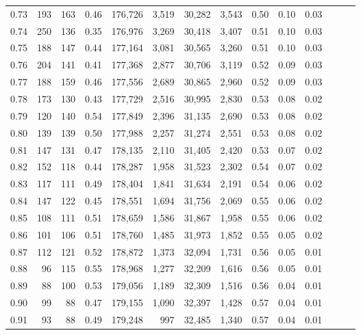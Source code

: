 \begin{tabular}{rrrrrrrrrrrrrr}
0.73 &    193 &  163 &  0.46 &  176,726 &    3,519 &  30,282 &   3,543 &  0.50 &  0.10 &      0.03 \\
0.74 &    250 &  136 &  0.35 &  176,976 &    3,269 &  30,418 &   3,407 &  0.51 &  0.10 &      0.03 \\
0.75 &    188 &  147 &  0.44 &  177,164 &    3,081 &  30,565 &   3,260 &  0.51 &  0.10 &      0.03 \\
0.76 &    204 &  141 &  0.41 &  177,368 &    2,877 &  30,706 &   3,119 &  0.52 &  0.09 &      0.03 \\
0.77 &    188 &  159 &  0.46 &  177,556 &    2,689 &  30,865 &   2,960 &  0.52 &  0.09 &      0.03 \\
0.78 &    173 &  130 &  0.43 &  177,729 &    2,516 &  30,995 &   2,830 &  0.53 &  0.08 &      0.02 \\
0.79 &    120 &  140 &  0.54 &  177,849 &    2,396 &  31,135 &   2,690 &  0.53 &  0.08 &      0.02 \\
0.80 &    139 &  139 &  0.50 &  177,988 &    2,257 &  31,274 &   2,551 &  0.53 &  0.08 &      0.02 \\
0.81 &    147 &  131 &  0.47 &  178,135 &    2,110 &  31,405 &   2,420 &  0.53 &  0.07 &      0.02 \\
0.82 &    152 &  118 &  0.44 &  178,287 &    1,958 &  31,523 &   2,302 &  0.54 &  0.07 &      0.02 \\
0.83 &    117 &  111 &  0.49 &  178,404 &    1,841 &  31,634 &   2,191 &  0.54 &  0.06 &      0.02 \\
0.84 &    147 &  122 &  0.45 &  178,551 &    1,694 &  31,756 &   2,069 &  0.55 &  0.06 &      0.02 \\
0.85 &    108 &  111 &  0.51 &  178,659 &    1,586 &  31,867 &   1,958 &  0.55 &  0.06 &      0.02 \\
0.86 &    101 &  106 &  0.51 &  178,760 &    1,485 &  31,973 &   1,852 &  0.55 &  0.05 &      0.02 \\
0.87 &    112 &  121 &  0.52 &  178,872 &    1,373 &  32,094 &   1,731 &  0.56 &  0.05 &      0.01 \\
0.88 &     96 &  115 &  0.55 &  178,968 &    1,277 &  32,209 &   1,616 &  0.56 &  0.05 &      0.01 \\
0.89 &     88 &  100 &  0.53 &  179,056 &    1,189 &  32,309 &   1,516 &  0.56 &  0.04 &      0.01 \\
0.90 &     99 &   88 &  0.47 &  179,155 &    1,090 &  32,397 &   1,428 &  0.57 &  0.04 &      0.01 \\
0.91 &     93 &   88 &  0.49 &  179,248 &      997 &  32,485 &   1,340 &  0.57 &  0.04 &      0.01 \\

\end{tabular}
